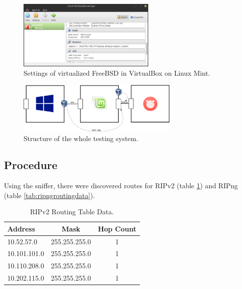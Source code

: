 \documentclass[10pt,a4paper,titlepage]{article}
\begin{document}
            \begin{figure}[h!]
                \begin{center}
                    \includegraphics[width=0.60\textwidth]{mintbsd.png}
                    \caption{Settings of virtualized FreeBSD in VirtualBox on Linux Mint. \label{fig:VBMintBSD}}
                \end{center}
            \end{figure}

            \begin{figure}[h!]
                \begin{center}
                    \includegraphics[width=0.70\textwidth]{programming.png}
                    \caption{Structure of the whole testing system. \label{fig:TestingSystem} \cite{WindowsLogo} \cite{MintLogo} \cite{FreeBSDLogo} \cite{VirtualBoxLogo}}
                \end{center}
            \end{figure}
        
        \newpage
        \subsection{Procedure}

            Using the sniffer, there were discovered routes for RIPv2 (table \ref{tab:ripv2routingdata})
            and RIPng (table \ref{tab:ripngroutingdata}).

            \begin{table}[h!]
                \begin{center}
                \begin{tabular}{|lcc|} \hline
                    Address      & Mask          & Hop Count \\ \hline
                    10.52.57.0   & 255.255.255.0 & 1 \\
                    10.101.101.0 & 255.255.255.0 & 1 \\
                    10.110.208.0 & 255.255.255.0 & 1 \\
                    10.202.115.0 & 255.255.255.0 & 1 \\ \hline
                \end{tabular}
                \caption{RIPv2 Routing Table Data. \label{tab:ripv2routingdata}}
                \end{center}
            \end{table}
\end{document}
